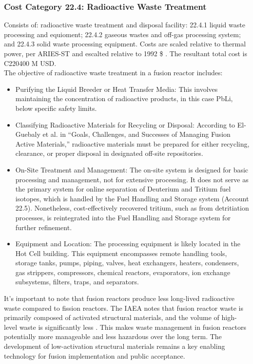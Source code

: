 
\subsubsection{Cost Category 22.4: Radioactive Waste Treatment} 
Consists of: radioactive waste treatment and disposal facility: 22.4.1 liquid waste processing and equioment; 22.4.2 gaseous wastes and off-gas processing system; and 22.4.3 solid waste processing equipment. Costs are scaled relative to thermal power, per ARIES-ST and escalted relative to 1992 \$ \cite{uDEL90b}. The resultant total cost is C220400 M USD. \\

The objective of radioactive waste treatment in a fusion reactor includes:
\begin{itemize}
\item Purifying the Liquid Breeder or Heat Transfer Media: This involves maintaining the concentration of radioactive products, in this case PbLi, below specific safety limits.

\item Classifying Radioactive Materials for Recycling or Disposal: According to El-Guebaly et al. in “Goals, Challenges, and Successes of Managing Fusion Active Materials,” radioactive materials must be prepared for either recycling, clearance, or proper disposal in designated off-site repositories.

\item On-Site Treatment and Management: The on-site system is designed for basic processing and management, not for extensive processing. It does not serve as the primary system for online separation of Deuterium and Tritium fuel isotopes, which is handled by the Fuel Handling and Storage system (Account 22.5). Nonetheless, cost-effectively recovered tritium, such as from detritiation processes, is reintegrated into the Fuel Handling and Storage system for further refinement.

\item Equipment and Location: The processing equipment is likely located in the Hot Cell building. This equipment encompasses remote handling tools, storage tanks, pumps, piping, valves, heat exchangers, heaters, condensers, gas strippers, compressors, chemical reactors, evaporators, ion exchange subsystems, filters, traps, and separators.

\end{itemize}

It's important to note that fusion reactors produce less long-lived radioactive waste compared to fission reactors. The IAEA notes that fusion reactor waste is primarily composed of activated structural materials, and the volume of high-level waste is significantly less \cite{girard2008summary}. This makes waste management in fusion reactors potentially more manageable and less hazardous over the long term. The development of low-activation structural materials remains a key enabling technology for fusion implementation and public acceptance.



